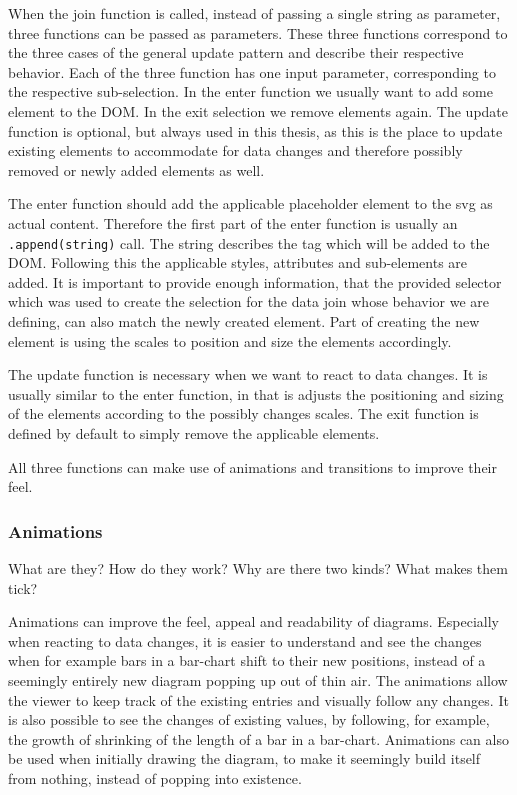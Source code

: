 When the join function is called, instead of passing a single string as parameter, three functions can be passed as parameters. These three functions correspond to the three cases of the general update pattern and describe their respective behavior. Each of the three function has one input parameter, corresponding to the respective sub-selection. In the enter function we usually want to add some element to the DOM. In the exit selection we remove elements again. The update function is optional, but always used in this thesis, as this is the place to update existing elements to accommodate for data changes and therefore possibly removed or newly added elements as well.

The enter function should add the applicable placeholder element to the svg as actual content. Therefore the first part of the enter function is usually an \verb|.append(string)| call. The string describes the tag which will be added to the DOM. Following this the applicable styles, attributes and sub-elements are added. It is important to provide enough information, that the provided selector which was used to create the selection for the data join whose behavior we are defining, can also match the newly created element. Part of creating the new element is using the scales to position and size the elements accordingly.

The update function is necessary when we want to react to data changes. It is usually similar to the enter function, in that is adjusts the positioning and sizing of the elements according to the possibly changes scales. The exit function is defined by default to simply remove the applicable elements.

All three functions can make use of animations and transitions to improve their feel.

\subsubsection{Animations}
What are they? How do they work? Why are there two kinds? What makes them tick?

Animations can improve the feel, appeal and readability of diagrams. Especially when reacting to data changes, it is easier to understand and see the changes when for example bars in a bar-chart shift to their new positions, instead of a seemingly entirely new diagram popping up out of thin air. The animations allow the viewer to keep track of the existing entries and visually follow any changes. It is also possible to see the changes of existing values, by following, for example, the growth of shrinking of the length of a bar in a bar-chart. Animations can also be used when initially drawing the diagram, to make it seemingly build itself from nothing, instead of popping into existence.

